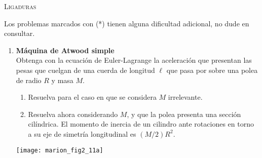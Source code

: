 \documentclass[11pt, spanish, a4paper, twoside]{article}
\begin{document}
\begin{center}
  \textsc{\large Ligaduras}
\end{center}

\noindent
Los problemas marcados con (*) tienen alguna dificultad adicional, no dude en consultar.
\begin{enumerate}




%


\item 
\begin{minipage}[t][4.5cm]{0.68\textwidth}
	\textbf{Máquina de Atwood simple}\\
	Obtenga con la ecuación de Euler-Lagrange la aceleración que presentan las pesas que cuelgan de una cuerda de longitud \(\ell\) que pasa por sobre una polea de radio \(R\) y masa \(M\).
	\begin{enumerate}
		\item Resuelva para el caso en que se considera \(M\) irrelevante.
		\item Resuelva ahora considerando \(M\), y que la polea presenta una sección cilíndrica.
			El momento de inercia de un cilindro ante rotaciones en torno a su eje de simetría longitudinal es \((M/2) R^2\).
	\end{enumerate}
\end{minipage}
\begin{minipage}[c][0cm][t]{0.3\textwidth}
	\texttt{[image: marion\_fig2\_11a]}
\end{minipage}



\end{enumerate}
\end{document}
